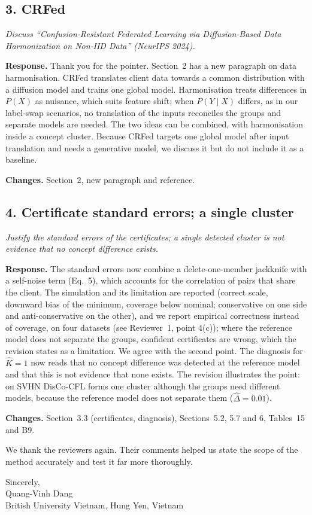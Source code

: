 \documentclass[11pt]{article}
\newenvironment{revcomment}{\par\medskip\noindent\begin{minipage}{\linewidth}\color{blue!45!black}\itshape}{\end{minipage}\par\smallskip}
\newcommand{\resp}{\par\noindent\textbf{Response.} }
\newcommand{\chg}{\par\noindent\textbf{Changes.} }
\begin{document}
\subsection*{3. CRFed}
\begin{revcomment}
Discuss ``Confusion-Resistant Federated Learning via Diffusion-Based Data Harmonization on Non-IID Data'' (NeurIPS 2024).
\end{revcomment}
\resp Thank you for the pointer. Section~2 has a new paragraph on data harmonisation. CRFed translates client data towards a common distribution with a diffusion model and trains one global model. Harmonisation treats differences in $P(X)$ as nuisance, which suits feature shift; when $P(Y\mid X)$ differs, as in our label-swap scenarios, no translation of the inputs reconciles the groups and separate models are needed. The two ideas can be combined, with harmonisation inside a concept cluster. Because CRFed targets one global model after input translation and needs a generative model, we discuss it but do not include it as a baseline.
\chg Section~2, new paragraph and reference.

\subsection*{4. Certificate standard errors; a single cluster}
\begin{revcomment}
Justify the standard errors of the certificates; a single detected cluster is not evidence that no concept difference exists.
\end{revcomment}
\resp The standard errors now combine a delete-one-member jackknife with a self-noise term (Eq.~5), which accounts for the correlation of pairs that share the client. The simulation and its limitation are reported (correct scale, downward bias of the minimum, coverage below nominal; conservative on one side and anti-conservative on the other), and we report empirical correctness instead of coverage, on four datasets (see Reviewer~1, point 4(c)); where the reference model does not separate the groups, confident certificates are wrong, which the revision states as a limitation. We agree with the second point. The diagnosis for $\hat K=1$ now reads that no concept difference was detected at the reference model and that this is not evidence that none exists. The revision illustrates the point: on SVHN DisCo-CFL forms one cluster although the groups need different models, because the reference model does not separate them ($\hat\Delta=0.01$).
\chg Section~3.3 (certificates, diagnosis), Sections~5.2, 5.7 and 6, Tables~15 and B9.

\medskip
We thank the reviewers again. Their comments helped us state the scope of the method accurately and test it far more thoroughly.

\medskip
Sincerely,\\
Quang-Vinh Dang\\
British University Vietnam, Hung Yen, Vietnam
\end{document}
